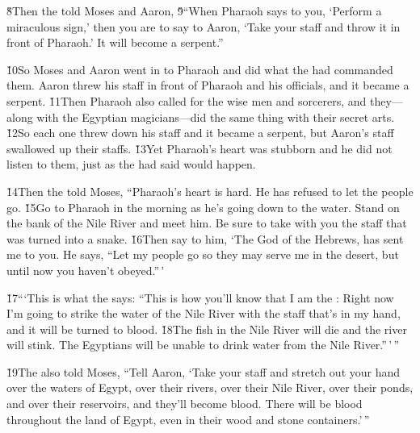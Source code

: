 \v{8}Then the  told Moses and Aaron, \v{9}``When Pharaoh says to you, `Perform a miraculous sign,' then you are to say to Aaron, `Take your staff and throw it in front of Pharaoh.' It will become a serpent.''

\v{10}So Moses and Aaron went in to Pharaoh and did what the  had commanded them. Aaron threw his staff in front of Pharaoh and his officials, and it became a serpent. \v{11}Then Pharaoh also called for the wise men and sorcerers, and they---along with the Egyptian magicians---did the same thing with their secret arts. \v{12}So each one threw down his staff and it became a serpent, but Aaron's staff swallowed up their staffs. \v{13}Yet Pharaoh's heart was stubborn and he did not listen to them, just as the  had said would happen.

\v{14}Then the  told Moses, ``Pharaoh's heart is hard. He has refused to let the people go. \v{15}Go to Pharaoh in the morning as he's going down to the water. Stand on the bank of the Nile River and meet him. Be sure to take with you the staff that was turned into a snake. \v{16}Then say to him, `The  God of the Hebrews, has sent me to you. He says, ``Let my people go so they may serve me in the desert, but until now you haven't obeyed.''\,'

\v{17}```This is what the  says: ``This is how you'll know that I am the : Right now I'm going to strike the water of the Nile River with the staff that's in my hand, and it will be turned to blood. \v{18}The fish in the Nile River will die and the river will stink. The Egyptians will be unable to drink water from the Nile River.''\,'\,''

\v{19}The  also told Moses, ``Tell Aaron, `Take your staff and stretch out your hand over the waters of Egypt, over their rivers, over their Nile River, over their ponds, and over their reservoirs, and they'll become blood. There will be blood throughout the land of Egypt, even in their wood and stone containers.'\,''

